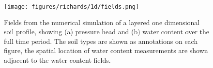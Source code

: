 \begin{figure}[ht]
\begin{center}
\texttt{[image: figures/richards/1d/fields.png]}
\end{center}
\caption{
Fields from the numerical simulation of a layered one dimensional soil profile,
showing (a) pressure head and (b) water content over the full time period.
The soil types are shown as annotations on each figure, the spatial location of water content measurements
are shown adjacent to the water content fields.
}
\label{fig:richards-1d-fields}
\end{figure}
